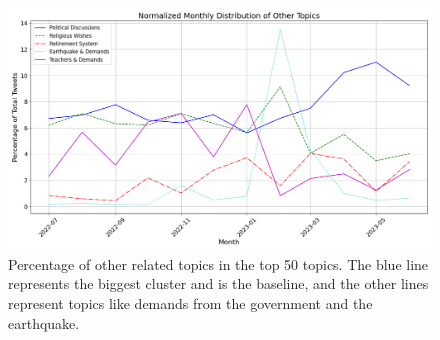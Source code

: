 \begin{figure}[htb]
    \centering
    \includegraphics[width=\linewidth]{figures/normalized_other_selected_topics_distribution_with_styles.png}
    \caption[Normalized monthly distribution of other related topics]
    {Percentage of other related topics in the top 50 topics. 
    The blue line represents the biggest cluster and is the baseline, 
    and the other lines represent topics like demands from the government and the earthquake.}\label{fig:topics_graph_other}
\end{figure}









